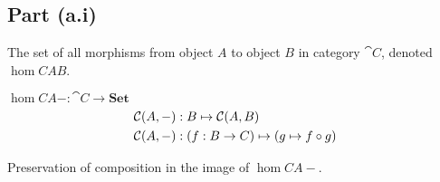 \subsection{Part (a.i)}\label{sec:q-1-a-i}
\begin{definition}\label{def:hom-set}
  The set of all morphisms from object $A$ to object $B$ in category $\cat{C}$, denoted $\hom{C}{A}{B}$.
\end{definition}

\begin{definition}\label{def:co-hom}
  $\hom{C}{A}{-} : \cat{C} \to \textbf{Set}$
  \begin{align*}
    \mathcal{C}(A, -) & : B \mapsto \mathcal{C}(A, B)\\
    \mathcal{C}(A, -) & : (f : B \to C) \mapsto (g \mapsto f \circ g)
  \end{align*}
\end{definition}

\begin{marginfigure}[10em]
  \caption{Preservation of composition in the image of $\hom{C}{A}{-}$.}\label{fig:co-functor}
\end{marginfigure}

